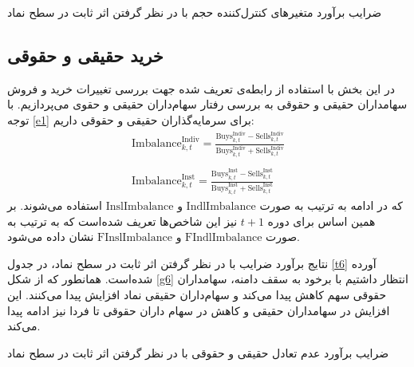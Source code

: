 \documentclass[12pt]{article}
\begin{document}

\begin{table}[htbp]
\centering
\begin{LTR}
\lr{}
\end{LTR}
\caption{ضرایب برآورد متغیر‌های کنترل‌کننده حجم با در نظر گرفتن اثر ثابت در سطح نماد}
\label{t5}
\end{table}


\restoregeometry
\FloatBarrier

\subsection{خرید حقیقی و حقوقی}
در این بخش با استفاده از رابطه‌ی تعریف شده جهت بررسی تغییرات خرید و فروش سهامداران حقیقی و حقوقی به بررسی رفتار سهام‌داران حقیقی و حقوی می‌پردازیم.
با توجه  
\ref{e1} 
برای سرمایه‌گذاران حقیقی و حقوقی داریم:
\begin{align*}
\text{Imbalance}_{k,t}^{\text{Indiv}} = \frac{\text{Buys}_{k,t}^{\text{Indiv}} - \text{Sells}_{k,t}^{\text{Indiv}}}{\text{Buys}_{k,t}^{\text{Indiv}} + \text{Sells}_{k,t}^{\text{Indiv}}}\\\\
\text{Imbalance}_{k,t}^{\text{Inst}} = \frac{\text{Buys}_{k,t}^{\text{Inst}} - \text{Sells}_{k,t}^{\text{Inst}}}{\text{Buys}_{k,t}^{\text{Inst}} + \text{Sells}_{k,t}^{\text{Inst}}}
\end{align*}
که در ادامه به ترتیب به صورت 
$ \text{IndlImbalance}  $
و
$ \text{InslImbalance} $
استفاده می‌شوند.
بر همین اساس برای دوره $ t+1 $ نیز این شاخص‌ها تعریف شده‌است که به ترتیب به صورت 
$ \text{FIndlImbalance}  $
و
$ \text{FInslImbalance} $
نشان داده می‌شود.

نتایج برآورد ضرایب با در نظر گرفتن اثر ثابت در سطح نماد، در جدول 
\ref{t6}
آورده شده‌است. همانطور که از شکل 
\ref{g6}
انتظار داشتیم با برخود به سقف دامنه، سهامداران حقوقی سهم کاهش پیدا می‌کند و سهام‌داران حقیقی نماد افزایش پیدا می‌کنند. 
این افزایش در سهامداران حقیقی و کاهش در سهام داران حقوقی تا فردا نیز ادامه پیدا می‌کند. 


\begin{table}[htbp]
\centering
\begin{LTR}
\lr{}
\end{LTR}
\caption{ضرایب برآورد عدم تعادل حقیقی و حقوقی با در نظر گرفتن اثر ثابت در سطح نماد}\label{t6}
\end{table}
\end{document}

